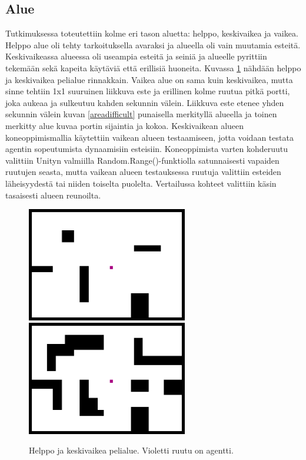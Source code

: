 \documentclass[utf8]{gradu3}
\begin{document}
\subsection{Alue}
\label{alue}

Tutkimuksessa toteutettiin kolme eri tason aluetta: helppo, keskivaikea ja vaikea. Helppo alue oli tehty tarkoituksella avaraksi ja alueella oli vain muutamia esteitä. Keskivaikeassa alueessa oli useampia esteitä ja seiniä ja alueelle pyrittiin tekemään sekä kapeita käytäviä että erillisiä huoneita. Kuvassa \ref{areabeginnerintermediate} nähdään helppo ja keskivaikea pelialue rinnakkain. Vaikea alue on sama kuin keskivaikea, mutta sinne tehtiin 1x1 suuruinen liikkuva este ja erillinen kolme ruutua pitkä portti, joka aukeaa ja sulkeutuu kahden sekunnin välein. Liikkuva este etenee yhden sekunnin välein kuvan \ref{areadifficult} punaisella merkityllä alueella ja toinen merkitty alue kuvaa portin sijaintia ja kokoa. Keskivaikean alueen koneoppimismallia käytettiin vaikean alueen testaamiseen, jotta voidaan testata agentin sopeutumista dynaamisiin esteisiin. Koneoppimista varten kohderuutu valittiin Unityn valmiilla Random.Range()-funktiolla satunnaisesti vapaiden ruutujen seasta, mutta vaikean alueen testauksessa ruutuja valittiin esteiden läheisyydestä tai niiden toiselta puolelta. Vertailussa kohteet valittiin käsin tasaisesti alueen reunoilta.

\begin{figure}[h]
\includegraphics[width=7cm]{area_beginner.png}
\includegraphics[width=7cm]{area_intermediate.png}
\centering
\caption{Helppo ja keskivaikea pelialue. Violetti ruutu on agentti.}
\label{areabeginnerintermediate}
\end{figure}
\end{document}
